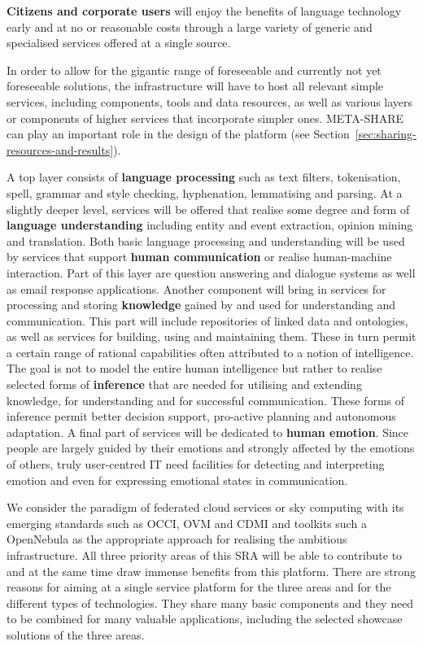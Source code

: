 \documentclass[10pt, plain]{../../metanetpaper}
\begin{document}
\begin{multicols}{2}
\textbf{Citizens and corporate users} will enjoy the benefits of language technology early and at no or reasonable costs through a large variety of generic and specialised services offered at a single source.

In order to allow for the gigantic range of foreseeable and currently not yet foreseeable solutions, the infrastructure will have to host all relevant simple services, including components, tools and data resources, as well as various layers or components of higher services that incorporate simpler ones. META-SHARE can play an important role in the design of the platform (see Section~\ref{sec:sharing-resources-and-results}).
 
A top layer consists of \textbf{language processing} such as text filters, tokenisation, spell, grammar and style checking, hyphenation, lemmatising and parsing. At a slightly deeper level, services will be offered that realise some degree and form of \textbf{language understanding} including entity and event extraction, opinion mining and translation. Both basic language processing and understanding will be used by services that support \textbf{human communication} or realise human-machine interaction. Part of this layer are question answering and dialogue systems as well as email response applications. Another component will bring in services for processing and storing \textbf{knowledge} gained by and used for understanding and communication. This part will include repositories of linked data and ontologies, as well as services for building, using and maintaining them. These in turn permit a certain range of rational capabilities often attributed to a notion of intelligence. The goal is not to model the entire human intelligence but rather to realise selected forms of \textbf{inference} that are needed for utilising and extending knowledge, for understanding and for successful communication. These forms of inference permit better decision support, pro-active planning and autonomous adaptation. A final part of services will be dedicated to \textbf{human emotion}. Since people are largely guided by their emotions and strongly affected by the emotions of others, truly user-centred IT need facilities for detecting and interpreting emotion and even for expressing emotional states in communication. 

We consider the paradigm of federated cloud services or sky computing with its emerging standards such as OCCI, OVM and CDMI and toolkits such a OpenNebula as the appropriate approach for realising the ambitious infrastructure. All three priority areas of this SRA will be able to contribute to and at the same time draw immense benefits from this platform. There are strong reasons for aiming at a single service platform for the three areas and for the different types of technologies. They share many basic components and they need to be combined for many valuable applications, including the selected showcase solutions of the three areas.


\end{multicols}
\end{document}
